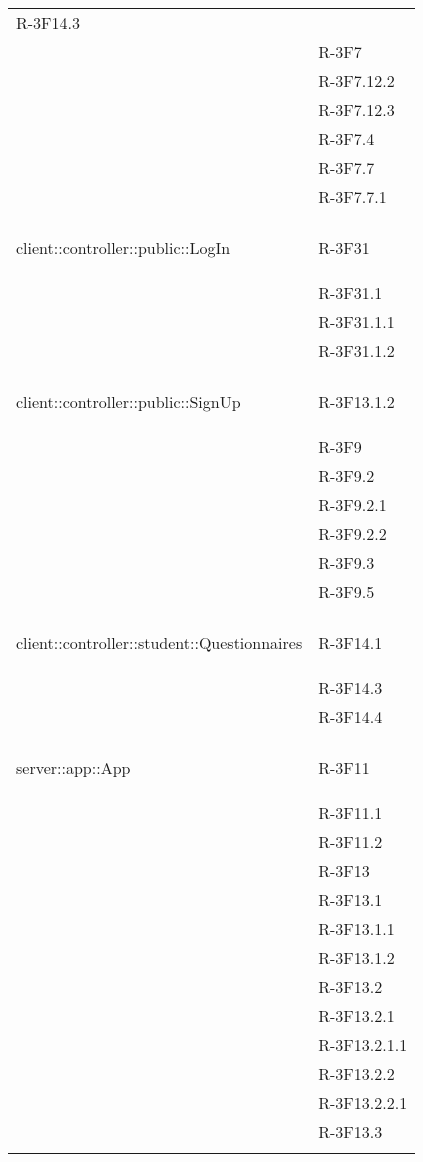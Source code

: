 \begin{longtable}{l p{3cm}}
	R-3F14.3 \tabularnewline &
	
	R-3F7 \tabularnewline &
	
	R-3F7.12.2 \tabularnewline &
	
	R-3F7.12.3 \tabularnewline &
	
	R-3F7.4 \tabularnewline &
	
	R-3F7.7 \tabularnewline &
	
	R-3F7.7.1 \tabularnewline &\tabularnewline
	\hline
	\hypertarget{client::controller::public::LogIn}{client::controller::public::LogIn} & R-3F31 \tabularnewline &
	
	R-3F31.1 \tabularnewline &
	
	R-3F31.1.1 \tabularnewline &
	
	R-3F31.1.2 \tabularnewline &\tabularnewline
	\hline
	\hypertarget{client::controller::public::SignUp}{client::controller::public::SignUp} & R-3F13.1.2 \tabularnewline &
	
	R-3F9 \tabularnewline &
	
	R-3F9.2 \tabularnewline &
	
	R-3F9.2.1 \tabularnewline &
	
	R-3F9.2.2 \tabularnewline &
	
	R-3F9.3 \tabularnewline &
	
	R-3F9.5 \tabularnewline &\tabularnewline
	\hline
	\hypertarget{client::controller::student::Questionnaires}{client::controller::student::Questionnaires} & R-3F14.1 \tabularnewline &
	
	R-3F14.3 \tabularnewline &
	
	R-3F14.4 \tabularnewline &\tabularnewline
	\hline
	\hypertarget{server::app::App}{server::app::App} & R-3F11 \tabularnewline &
	
	R-3F11.1 \tabularnewline &
	
	R-3F11.2 \tabularnewline &
	
	R-3F13 \tabularnewline &
	
	R-3F13.1 \tabularnewline &
	
	R-3F13.1.1 \tabularnewline &
	
	R-3F13.1.2 \tabularnewline &
	
	R-3F13.2 \tabularnewline &
	
	R-3F13.2.1 \tabularnewline &
	
	R-3F13.2.1.1 \tabularnewline &
	
	R-3F13.2.2 \tabularnewline &
	
	R-3F13.2.2.1 \tabularnewline &
	
	R-3F13.3 \tabularnewline &
	

\end{longtable}
